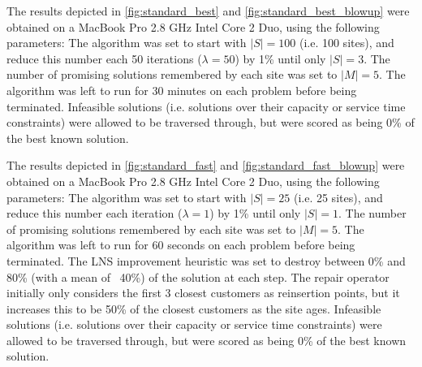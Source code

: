 
The results depicted in \ref{fig:standard_best} and \ref{fig:standard_best_blowup} were obtained on a MacBook Pro 2.8 GHz Intel Core 2 Duo, using the following parameters: The algorithm was set to start with $|S| = 100$ (i.e. 100 sites), and reduce this number each 50 iterations ($\lambda = 50$) by 1\% until only $|S| = 3$. The number of promising solutions remembered by each site was set to $|M| = 5$. The algorithm was left to run for 30 minutes on each problem before being terminated. Infeasible solutions (i.e. solutions over their capacity or service time constraints) were allowed to be traversed through, but were scored as being 0\% of the best known solution.




The results depicted in \ref{fig:standard_fast} and \ref{fig:standard_fast_blowup} were obtained on a MacBook Pro 2.8 GHz Intel Core 2 Duo, using the following parameters: The algorithm was set to start with $|S| = 25$ (i.e. 25 sites), and reduce this number each iteration ($\lambda = 1$) by 1\% until only $|S| = 1$. The number of promising solutions remembered by each site was set to $|M| = 5$. The algorithm was left to run for 60 seconds on each problem before being terminated. The LNS improvement heuristic was set to destroy between 0\% and 80\% (with a mean of ~40\%) of the solution at each step. The repair operator initially only considers the first 3 closest customers as reinsertion points, but it increases this to be 50\% of the closest customers as the site ages. Infeasible solutions (i.e. solutions over their capacity or service time constraints) were allowed to be traversed through, but were scored as being 0\% of the best known solution.

